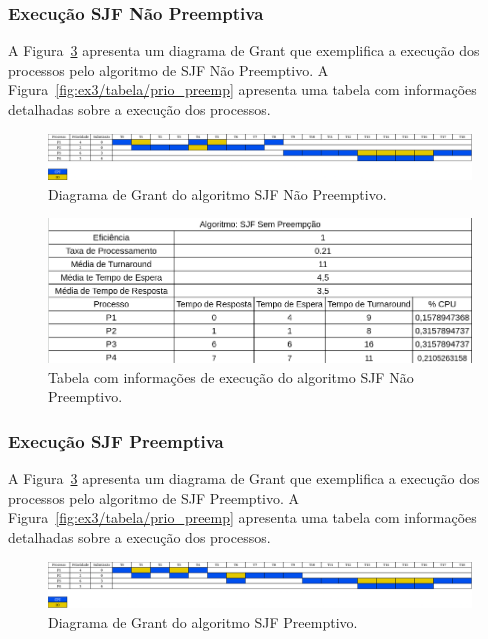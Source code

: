 \documentclass[
	12pt,				%
	oneside,   	        %
	a4paper,			%
	english,			%
	french,				%
	spanish,			%
	brazil,				%
	]{pacotes/abntex2}
\begin{document}
\subsubsection{Execução SJF Não Preemptiva}
\label{subsubsec:sjf_sem_preemp}

A Figura~\ref{fig:ex3/diagrama/sjf_sem_preemp} apresenta um diagrama de Grant que exemplifica a execução dos processos pelo algoritmo de SJF Não Preemptivo. A Figura~\ref{fig:ex3/tabela/prio_preemp} apresenta uma tabela com informações detalhadas sobre a execução dos processos. 

\begin{figure}[H]
  \centering
  \includegraphics[scale=0.20]{figuras/ex3/diagrama/sjf_sem_preemp.png}
  \caption{Diagrama de Grant do algoritmo SJF Não Preemptivo.}
  \label{fig:ex3/diagrama/sjf_sem_preemp}
\end{figure}

\begin{figure}[H]
  \centering
  \includegraphics[scale=0.5]{figuras/ex3/tabela/sjf_sem_preemp.png}
  \caption{Tabela com informações de execução do algoritmo SJF Não Preemptivo.}
  \label{fig:ex3/tabela/sjf_sem_preemp}
\end{figure}

\subsubsection{Execução SJF Preemptiva}
\label{subsubsec:sjf_preemp}

A Figura~\ref{fig:ex3/diagrama/sjf_sem_preemp} apresenta um diagrama de Grant que exemplifica a execução dos processos pelo algoritmo de SJF Preemptivo. A Figura~\ref{fig:ex3/tabela/prio_preemp} apresenta uma tabela com informações detalhadas sobre a execução dos processos.

\begin{figure}[H]
  \centering
  \includegraphics[scale=0.20]{figuras/ex3/diagrama/sjf_preemp.png}
  \caption{Diagrama de Grant do algoritmo SJF Preemptivo.}
  \label{fig:ex3/diagrama/sjf_sem_preemp}
\end{figure}
\end{document}
